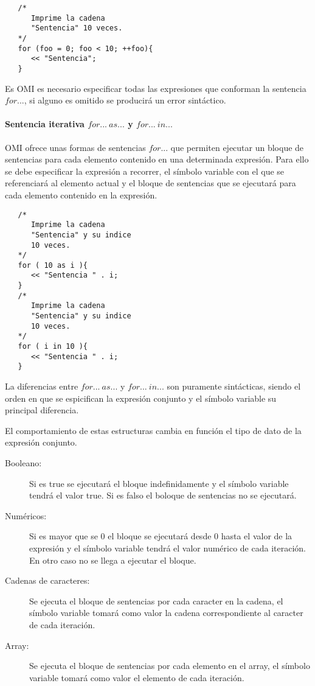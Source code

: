 \begin{lstlisting}
   /*
      Imprime la cadena 
      "Sentencia" 10 veces.
   */
   for (foo = 0; foo < 10; ++foo){
      << "Sentencia"; 
   }
\end{lstlisting}

Es OMI es necesario especificar todas las expresiones que conforman la sentencia $for...$, si alguno es omitido se
producirá un error sintáctico.


\paragraph{Sentencia iterativa $for...\ as...$ y $for...\ in...$} \label{sec:stmt_foreach}

OMI ofrece unas formas de sentencias $for...$ que permiten ejecutar un bloque de sentencias para cada elemento contenido 
en una determinada expresión. Para ello se debe especificar la expresión a recorrer, el símbolo variable con el 
que se referenciará al elemento actual y el bloque de sentencias que se ejecutará para cada elemento contenido 
en la expresión. \\


\begin{lstlisting}
   /*
      Imprime la cadena 
      "Sentencia" y su indice 
      10 veces.
   */
   for ( 10 as i ){
      << "Sentencia " . i; 
   }
   /*
      Imprime la cadena 
      "Sentencia" y su indice
      10 veces.
   */
   for ( i in 10 ){
      << "Sentencia " . i; 
   }
\end{lstlisting}


La diferencias entre $for...\ as...$ y $for...\ in...$ son puramente sintácticas, siendo el orden en que se espicifican la expresión conjunto y el
símbolo variable su principal diferencia.

El comportamiento de estas estructuras cambia en función el tipo de dato de la expresión conjunto. 

\begin{description}
\item [Booleano:] Si es true se ejecutará el bloque indefinidamente y el símbolo variable tendrá el valor true. Si es falso el boloque de sentencias no se ejecutará.
\item [Numéricos:] Si es mayor que se $0$ el bloque se ejecutará desde 0 hasta el valor de la expresión y el símbolo variable tendrá el valor numérico de cada iteración.
En otro caso no se llega a ejecutar el bloque.
\item [Cadenas de caracteres:] Se ejecuta el bloque de sentencias por cada caracter en la cadena, el símbolo variable tomará como valor la cadena correspondiente al 
caracter de cada iteración.
\item [Array:] Se ejecuta el bloque de sentencias por cada elemento en el array, el símbolo variable tomará como valor el elemento de cada iteración.
\end{description} 


